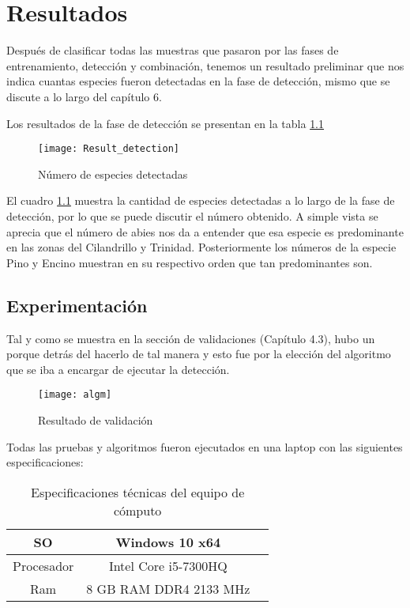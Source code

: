 \break

\chapter{Resultados}
Después de clasificar todas las muestras que pasaron por las fases de entrenamiento, detección y combinación, tenemos un resultado preliminar que nos indica cuantas especies fueron detectadas en la fase de detección, mismo que se discute a lo largo del capítulo 6.


Los resultados de la fase de detección se presentan en la tabla \ref{Numero de especies}

\begin{figure}[H]
  \centering
  \begin{minipage}[b]{0.5\textwidth}
        \texttt{[image: Result\_detection]}
    \caption{Número de especies detectadas}
  \end{minipage}
  \label{Numero de especies}
\end{figure}

El cuadro \ref{Numero de especies} muestra la cantidad de especies detectadas a lo largo de la fase de detección, por lo que se puede discutir el número obtenido. A simple vista se aprecia que el número de abies nos da a entender que esa especie es predominante en las zonas del Cilandrillo y Trinidad. Posteriormente los números de la especie Pino y Encino muestran en su respectivo orden que tan predominantes son.

\section{Experimentación}
Tal y como se muestra en la sección de validaciones (Capítulo 4.3), hubo un porque detrás del hacerlo de tal manera y esto fue por la elección del algoritmo que se iba a encargar de ejecutar la detección.


\begin{figure}[H]
  \centering
  \begin{minipage}[b]{0.8\textwidth}
        \texttt{[image: algm]}
    \caption{Resultado de validación}
  \end{minipage}
\end{figure}


Todas las pruebas y algoritmos fueron ejecutados en una laptop con las siguientes especificaciones:

\begin{table}[H]
	{\centering
		\begin{tabular}{|c|c|c|}
			\hline
			SO & Windows 10 x64\\
			\hline
			Procesador & Intel Core i5-7300HQ\\
			\hline
			Ram & 8 GB RAM DDR4 2133 MHz\\
			\hline
		\end{tabular}
	\caption{Especificaciones técnicas del equipo de cómputo}
	\label{tab:Especificaciones técnicas del PC}
	}
\end{table}

